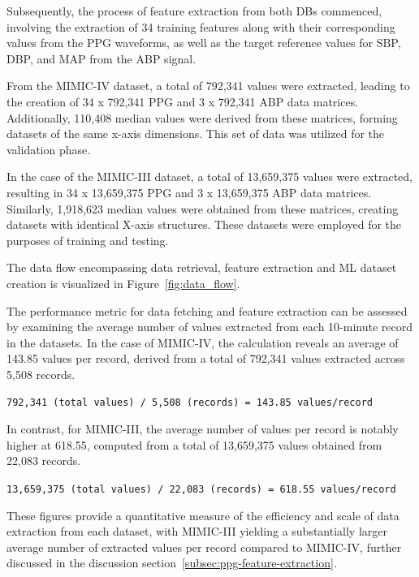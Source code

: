 Subsequently, the process of feature extraction from both DBs commenced, involving the extraction of 34 training features along with their corresponding values from the PPG waveforms,
as well as the target reference values for SBP, DBP, and MAP from the ABP signal.

From the MIMIC-IV dataset, a total of 792,341 values were extracted, leading to the creation of 34 x 792,341 PPG and 3 x 792,341 ABP data matrices.
Additionally, 110,408 median values were derived from these matrices, forming datasets of the same x-axis dimensions.
This set of data was utilized for the validation phase.

In the case of the MIMIC-III dataset, a total of 13,659,375 values were extracted, resulting in 34 x 13,659,375 PPG and 3 x 13,659,375 ABP data matrices.
Similarly, 1,918,623 median values were obtained from these matrices, creating datasets with identical X-axis structures.
These datasets were employed for the purposes of training and testing.

The data flow encompassing data retrieval, feature extraction and ML dataset creation is visualized in Figure~\ref{fig:data_flow}.

The performance metric for data fetching and feature extraction can be assessed by examining the average number of values extracted from each 10-minute record in the datasets.
In the case of MIMIC-IV, the calculation reveals an average of 143.85 values per record, derived from a total of 792,341 values extracted across 5,508 records.

\vspace{0.3cm}
\texttt{792,341 (total values) / 5,508 (records) = 143.85 values/record}
\vspace{0.3cm}

In contrast, for MIMIC-III, the average number of values per record is notably higher at 618.55, computed from a total of 13,659,375 values obtained from 22,083 records.

\vspace{0.3cm}
\texttt{13,659,375 (total values) / 22,083 (records) = 618.55 values/record}
\vspace{0.3cm}

These figures provide a quantitative measure of the efficiency and scale of data extraction from each dataset, with MIMIC-III yielding a substantially larger average number of extracted values per record
compared to MIMIC-IV, further discussed in the discussion section~\ref{subsec:ppg-feature-extraction}.

